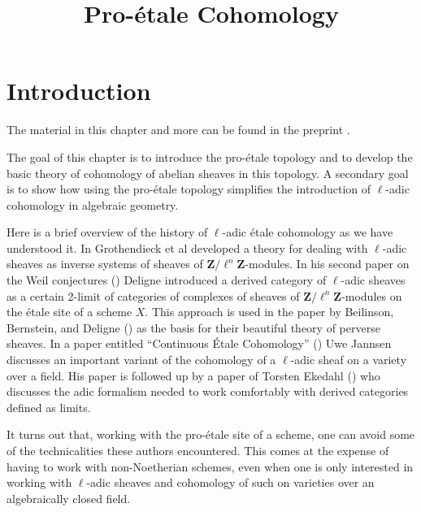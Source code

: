 

%


\title{Pro-\'etale Cohomology}


\maketitle

\label{section-phantom}

\tableofcontents

\section{Introduction}
\label{section-introduction}

\noindent
The material in this chapter and more can be found in the preprint \cite{BS}.

\medskip\noindent
The goal of this chapter is to introduce the pro-\'etale topology and to
develop the basic theory of cohomology of abelian sheaves in this topology.
A secondary goal is to show how using the pro-\'etale topology simplifies
the introduction of $\ell$-adic cohomology in algebraic geometry.

\medskip\noindent
Here is a brief overview of the history of $\ell$-adic \'etale cohomology
as we have understood it.
In \cite[Expos\'es V and VI]{SGA5} Grothendieck et al developed a theory for
dealing with $\ell$-adic sheaves as inverse systems of sheaves of
$\mathbf{Z}/\ell^n\mathbf{Z}$-modules.
In his second paper on the Weil conjectures (\cite{WeilII}) Deligne introduced
a derived category of $\ell$-adic sheaves as a certain 2-limit of categories
of complexes of sheaves of $\mathbf{Z}/\ell^n\mathbf{Z}$-modules on the
\'etale site of a scheme $X$. This approach is used in the paper by
Beilinson, Bernstein, and Deligne (\cite{BBD}) as the basis for their
beautiful theory of perverse sheaves. In a paper entitled ``Continuous
\'Etale Cohomology'' (\cite{Jannsen}) Uwe Jannsen discusses an important
variant of the cohomology of a $\ell$-adic sheaf on a variety over a field.
His paper is followed up by a paper of Torsten Ekedahl (\cite{Ekedahl})
who discusses the adic formalism needed to work comfortably with derived
categories defined as limits.

\medskip\noindent
It turns out that, working with the pro-\'etale site of a scheme,
one can avoid some of the technicalities these authors encountered.
This comes at the expense of having to work with non-Noetherian schemes,
even when one is only interested in working with $\ell$-adic sheaves
and cohomology of such on varieties over an algebraically closed field.

